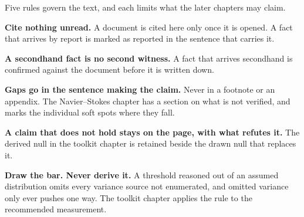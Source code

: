 Five rules govern the text, and each limits what the later chapters may claim.

\textbf{Cite nothing unread.} A document is cited here only once it is opened. A fact that arrives by
report is marked as reported in the sentence that carries it.

\textbf{A secondhand fact is no second witness.} A fact that arrives secondhand is confirmed against
the document before it is written down.

\textbf{Gaps go in the sentence making the claim.} Never in a footnote or an appendix. The
Navier--Stokes chapter has a section on what is not verified, and marks the individual soft spots
where they fall.

\textbf{A claim that does not hold stays on the page, with what refutes it.} The derived null in the
toolkit chapter is retained beside the drawn null that replaces it.

\textbf{Draw the bar. Never derive it.} A threshold reasoned out of an assumed distribution omits
every variance source not enumerated, and omitted variance only ever pushes one way. The toolkit
chapter applies the rule to the recommended measurement.
